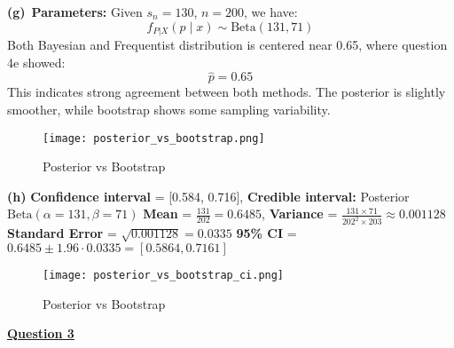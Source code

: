 \documentclass[12pt]{article}
\begin{document}
\noindent\textbf{(g)}\
 \newline\indent\textbf{Parameters:} Given \( s_n = 130 \), \( n = 200 \), we have:
\[
f_{P|X}(p \mid x) \sim \text{Beta}(131, 71)
\]
Both Bayesian and Frequentist distribution is centered near 0.65, where question 4e showed: \[\hat{p}=0.65\]This indicates strong agreement between both methods. The posterior is slightly smoother, while bootstrap shows some sampling variability.

\begin{figure}[H]
    \centering
    \caption{Posterior vs Bootstrap}
    \texttt{[image: posterior\_vs\_bootstrap.png]}
    \label{fig:posterior_vs_bootstrap}
\end{figure}

\noindent\textbf{(h)}
\noindent\newline
\textbf{Confidence interval} = [0.584, 0.716], \quad
\newline\textbf{Credible interval:} Posterior $\text{Beta}(\alpha = 131, \beta = 71)$ 
\vspace{1em}
\newline\textbf{Mean} = $\frac{131}{202} = 0.6485$, \quad
\textbf{Variance} = $\frac{131 \times 71}{202^2 \times 203} \approx 0.001128$ 
\vspace{1em}
\newline\textbf{Standard Error} = $\sqrt{0.001128} = 0.0335$ 
\vspace{1em}
\newline\textbf{95\% CI} = $0.6485 \pm 1.96 \cdot 0.0335 = \boxed{[0.5864, 0.7161]}$

\begin{figure}[H]
\centering
\begin{minipage}{0.7\textwidth}
  \caption{Posterior vs Bootstrap}
    \hspace{-2em} %
    \texttt{[image: posterior\_vs\_bootstrap\_ci.png]}
    \label{fig:posterior_vs_bootstrap}
\end{minipage}
\begin{minipage}{0.45\textwidth}
    \small
    \end{minipage}
\end{figure}


\vspace{1em}
\noindent\textbf{\underline{Question 3}}\par
\end{document}
